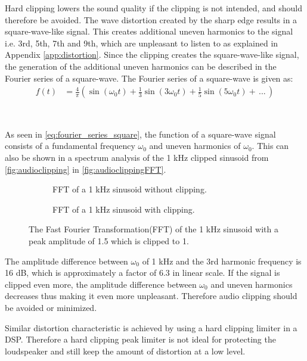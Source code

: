 Hard clipping lowers the sound quality if the clipping is not intended, and should therefore be avoided. The wave distortion created by the sharp edge results in a square-wave-like signal. This creates additional uneven harmonics to the signal i.e. 3rd, 5th, 7th and 9th, which are unpleasant to listen to as explained in Appendix \ref{app:distortion}. Since the clipping creates the square-wave-like signal, the generation of the additional uneven harmonics can be described in the Fourier series of a square-wave. The Fourier series of a square-wave is given as:
\begin{align}\label{eq:fourier_series_square}
f(t) &= \frac{4}{\pi} (\sin(\omega_0 t) + \frac{1}{3}\sin(3 \omega_0 t) + \frac{1}{5}\sin(5 \omega_0 t) + \, ... \,)
\end{align}
\begin{where}
\\
\end{where}

As seen in \autoref{eq:fourier_series_square}, the function of a square-wave signal consists of a fundamental frequency $\omega_0$ and uneven harmonics of $\omega_0$. This can also be shown in a spectrum analysis of the 1 kHz clipped sinusoid from \autoref{fig:audioclipping} in \autoref{fig:audioclippingFFT}.

\begin{figure}[H]
\centering
\begin{subfigure}[t]{0.47\textwidth}
	
	\caption{FFT of a 1 kHz sinusoid without clipping.}
	\label{fig:clippingCleanFFT}
\end{subfigure}
\hspace{6mm} 
\begin{subfigure}[t]{0.47\textwidth}
	
	\caption{FFT of a 1 kHz sinusoid with clipping.}
	\label{fig:clippingDistFFT}
\end{subfigure}
\caption{The Fast Fourier Transformation(FFT) of the 1 kHz sinusoid with a peak amplitude of 1.5 which is clipped to 1. }
\label{fig:audioclippingFFT}
\end{figure}
The amplitude difference between $\omega_0$ of 1 kHz and the 3rd harmonic frequency is 16 dB, which is approximately a factor of 6.3 in linear scale. If the signal is clipped even more, the amplitude difference between $\omega_0$ and uneven harmonics decreases thus making it even more unpleasant. Therefore audio clipping should be avoided or minimized.

Similar distortion characteristic is achieved by using a hard clipping limiter in a DSP. Therefore a hard clipping peak limiter is not ideal for protecting the loudspeaker and still keep the amount of distortion at a low level.









